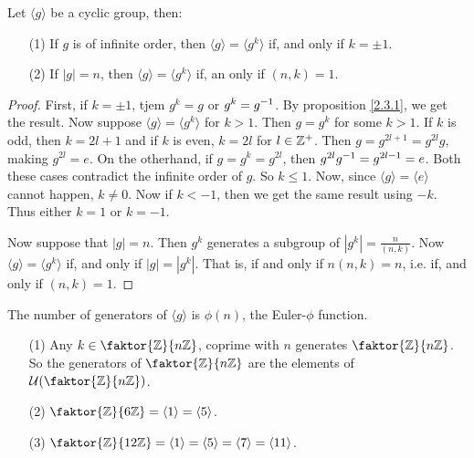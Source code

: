 \begin{proposition}\label{proposition_2.3.7}
  Let $\langle g \rangle$ be a cyclic group, then:
  \begin{enumerate}
    \item[(1)] If $g$ is of infinite order, then  $\langle g
      \rangle=\langle g^k \rangle$ if, and only if $k=\pm{1}$.

    \item[(2)] If $|g|=n$, then $\langle g \rangle=\langle g^k
      \rangle$ if, an only if $(n,k)=1$.
  \end{enumerate}
\end{proposition}
\begin{proof}
  First, if $k=\pm 1$, tjem  $g^k=g$ or  $g^k=g^{-1}$. By proposition \ref{2.3.1},
  we get the result. Now suppose $\langle g \rangle=\langle g^k \rangle$ for
  $k>1$. Then $g=g^k$ for some  $k>1$. If  $k$ is odd, then  $k=2l+1$ and if
  $k$ is even, $k=2l$ for  $l \in \mathbb{Z}^+$. Then  $g=g^{2l+1}=g^{2l}g$, making
  $g^{2l}=e$. On the otherhand, if $g=g^k=g^{2l}$, then $g^{2l}g^{-1}=g^{2l-1}=e$.
  Both these cases contradict the infinite order of $g$. So  $k \leq 1$. Now,
  since $\langle g \rangle=\langle e \rangle$ cannot happen, $k \neq 0$. Now if
  $k<-1$, then we get the same result using  $-k$. Thus either  $k=1$ or  $k=-1$.

  Now suppose that  $|g|=n$. Then $g^k$ generates a subgroup of
  $|g^k|=\frac{n}{(n,k)}$. Now $\langle g \rangle=\langle g^k \rangle$ if, and
  only if $|g|=|g^k|$. That is, if and only if  $n(n,k)=n$, i.e. if, and only
  if $(n,k)=1$.
\end{proof}
\begin{corollary}
  The number of generators of $\langle g \rangle$ is $\phi(n)$, the
  Euler-$\phi$ function.
\end{corollary}

\begin{example}
  \begin{enumerate}
    \item[(1)] Any $k \in \faktor{\Z}{n\Z}$, coprime with $n$ generates
      $\faktor{\Z}{n\Z}$. So the generators of $\faktor{\Z}{n\Z}$ are the
      elements of $\Uc{(\faktor{\Z}{n\Z})}$.

    \item[(2)] $\faktor{\Z}{6\Z}=\langle 1 \rangle=\langle 5 \rangle$.

    \item[(3)] $\faktor{\Z}{12\Z}=\langle 1 \rangle=\langle 5
      \rangle=\langle 7 \rangle=\langle 11 \rangle$.
  \end{enumerate}
\end{example}

